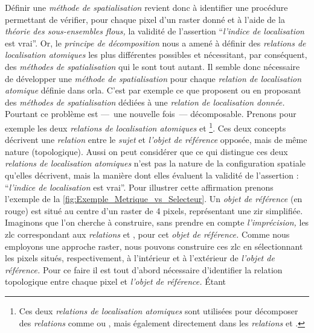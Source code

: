 Définir une \emph{méthode de spatialisation} revient donc à identifier
une procédure permettant de vérifier, pour chaque pixel d'un raster
donné et à l'aide de la \emph{théorie des sous-ensembles flous,} la
validité de l'assertion \enquote{\emph{l'indice de localisation} est
  vrai}. Or, le \emph{principe de décomposition} nous a amené à
définir des \emph{relations de localisation atomiques} les plus
différentes possibles et nécessitant, par conséquent, des
\emph{méthodes de spatialisation} qui le sont tout autant. Il semble
donc nécessaire de développer une \emph{méthode de spatialisation}
pour chaque \emph{relation de localisation atomique} définie dans
\ac{orla}. C'est par exemple ce que proposent \textcite{Vanegas2011}
ou \textcite{Takemura2012} en proposant des \emph{méthodes de
  spatialisation} dédiées à une \emph{relation de localisation
  donnée.} Pourtant ce problème est ---~une nouvelle fois~---
décomposable. Prenons pour exemple les deux \emph{relations de
  localisation atomiques}  et
 \footnote{Ces deux \emph{relations de
    localisation atomiques} sont utilisées pour décomposer des
  \emph{relations} comme \protect{}
  ou \protect{}, mais également
  directement dans les \emph{relations}
  \protect{} et
  \protect{}.}. Ces deux concepts
décrivent une \emph{relation} entre le \emph{sujet} et \emph{l'objet
  de référence} opposée, mais de même nature (\ie topologique). Aussi
on peut considérer que ce qui distingue ces deux \emph{relations de
  localisation atomiques} n'est pas la nature de la configuration
spatiale qu'elles décrivent, mais la manière dont elles évaluent la
validité de l'assertion : \enquote{\emph{l'indice de localisation} est
  vrai}. Pour illustrer cette affirmation prenons l'exemple de la
\autoref{fig:Exemple_Metrique_vs_Selecteur}. Un \emph{objet de
  référence} (en rouge) est situé au centre d'un raster de 4 pixels,
représentant une \ac{zir} simplifiée. Imaginons que l'on cherche à
construire, sans prendre en compte \emph{l'imprécision,} les \ac{zlc}
correspondant aux \emph{relations}  et
, pour cet \emph{objet de référence.} Comme nous
employons une approche raster, nous pouvons construire ces \ac{zlc} en
sélectionnant les pixels situés, respectivement, à l'intérieur et à
l'extérieur de \emph{l'objet de référence.}
%
Pour ce faire il est tout d'abord nécessaire d'identifier la relation
topologique entre chaque pixel et \emph{l'objet de référence.} Étant
